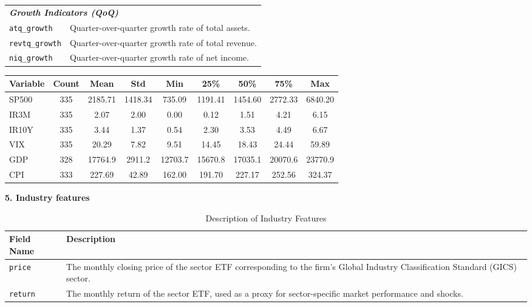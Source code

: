 \documentclass[12pt]{article}
\begin{document}
\begin{singlespace}
\begin{table}[H]
\begin{tabular}{l p{10cm}}
\multicolumn{2}{l}{\textit{\textbf{Growth Indicators (QoQ)}}} \\
\texttt{atq\_growth} & Quarter-over-quarter growth rate of total assets. \\
\texttt{revtq\_growth} & Quarter-over-quarter growth rate of total revenue. \\
\texttt{niq\_growth} & Quarter-over-quarter growth rate of net income. \\
\bottomrule
\end{tabular}
\end{table}
\end{singlespace}


\begin{singlespace}
\begin{table}[H]
\centering
\footnotesize
\begin{tabular}{lcccccccc}
\toprule
\textbf{Variable} & \textbf{Count} & \textbf{Mean} & \textbf{Std} & \textbf{Min} & \textbf{25\%} & \textbf{50\%} & \textbf{75\%} & \textbf{Max} \\
\midrule
SP500 & 335 & 2185.71 & 1418.34 & 735.09 & 1191.41 & 1454.60 & 2772.33 & 6840.20 \\
IR3M & 335 & 2.07 & 2.00 & 0.00 & 0.12 & 1.51 & 4.21 & 6.15 \\
IR10Y & 335 & 3.44 & 1.37 & 0.54 & 2.30 & 3.53 & 4.49 & 6.67 \\
VIX & 335 & 20.29 & 7.82 & 9.51 & 14.45 & 18.43 & 24.44 & 59.89 \\
GDP & 328 & 17764.9 & 2911.2 & 12703.7 & 15670.8 & 17035.1 & 20070.6 & 23770.9 \\
CPI & 333 & 227.69 & 42.89 & 162.00 & 191.70 & 227.17 & 252.56 & 324.37 \\
\bottomrule
\end{tabular}
\end{table}
\end{singlespace}

\textbf{5. Industry features}

\begin{singlespace}
\begin{table}[H]
\centering
\caption{Description of Industry Features}
\label{tab:industry_features}
\begin{tabular}{l p{10cm}}
\toprule
\textbf{Field Name} & \textbf{Description} \\
\midrule
\texttt{price} & The monthly closing price of the sector ETF corresponding to the firm's Global Industry Classification Standard (GICS) sector. \\
\texttt{return} & The monthly return of the sector ETF, used as a proxy for sector-specific market performance and shocks. \\
\bottomrule
\end{tabular}
\end{table}
\end{singlespace}
\end{document}
